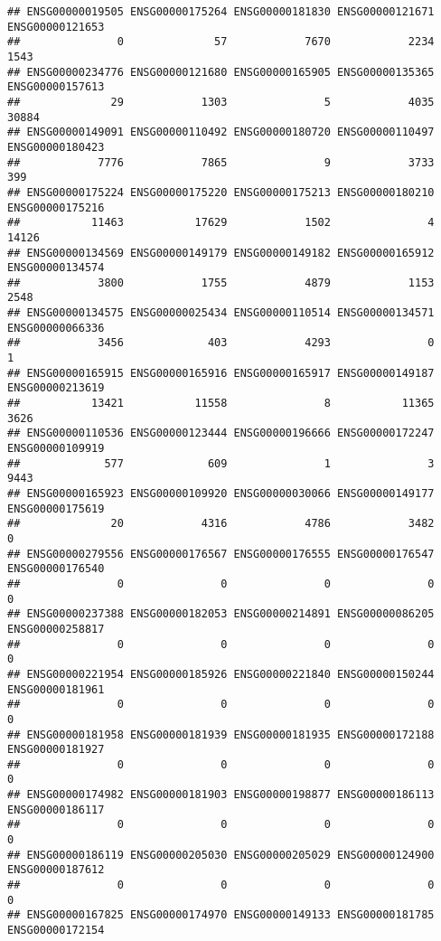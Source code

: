 \documentclass[
]{article}
\begin{document}
\begin{verbatim}
## ENSG00000019505 ENSG00000175264 ENSG00000181830 ENSG00000121671 ENSG00000121653 
##               0              57            7670            2234            1543 
## ENSG00000234776 ENSG00000121680 ENSG00000165905 ENSG00000135365 ENSG00000157613 
##              29            1303               5            4035           30884 
## ENSG00000149091 ENSG00000110492 ENSG00000180720 ENSG00000110497 ENSG00000180423 
##            7776            7865               9            3733             399 
## ENSG00000175224 ENSG00000175220 ENSG00000175213 ENSG00000180210 ENSG00000175216 
##           11463           17629            1502               4           14126 
## ENSG00000134569 ENSG00000149179 ENSG00000149182 ENSG00000165912 ENSG00000134574 
##            3800            1755            4879            1153            2548 
## ENSG00000134575 ENSG00000025434 ENSG00000110514 ENSG00000134571 ENSG00000066336 
##            3456             403            4293               0               1 
## ENSG00000165915 ENSG00000165916 ENSG00000165917 ENSG00000149187 ENSG00000213619 
##           13421           11558               8           11365            3626 
## ENSG00000110536 ENSG00000123444 ENSG00000196666 ENSG00000172247 ENSG00000109919 
##             577             609               1               3            9443 
## ENSG00000165923 ENSG00000109920 ENSG00000030066 ENSG00000149177 ENSG00000175619 
##              20            4316            4786            3482               0 
## ENSG00000279556 ENSG00000176567 ENSG00000176555 ENSG00000176547 ENSG00000176540 
##               0               0               0               0               0 
## ENSG00000237388 ENSG00000182053 ENSG00000214891 ENSG00000086205 ENSG00000258817 
##               0               0               0               0               0 
## ENSG00000221954 ENSG00000185926 ENSG00000221840 ENSG00000150244 ENSG00000181961 
##               0               0               0               0               0 
## ENSG00000181958 ENSG00000181939 ENSG00000181935 ENSG00000172188 ENSG00000181927 
##               0               0               0               0               0 
## ENSG00000174982 ENSG00000181903 ENSG00000198877 ENSG00000186113 ENSG00000186117 
##               0               0               0               0               0 
## ENSG00000186119 ENSG00000205030 ENSG00000205029 ENSG00000124900 ENSG00000187612 
##               0               0               0               0               0 
## ENSG00000167825 ENSG00000174970 ENSG00000149133 ENSG00000181785 ENSG00000172154 

\end{verbatim}
\end{document}
